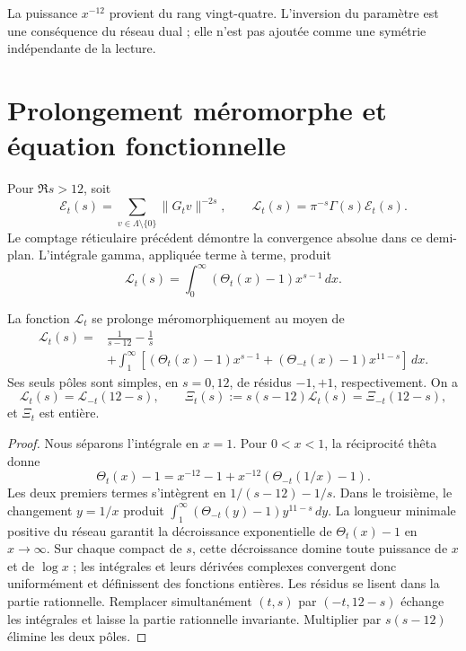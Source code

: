 La puissance \(x^{-12}\) provient du rang vingt-quatre. L’inversion du paramètre est une conséquence du réseau dual ; elle n’est pas ajoutée comme une symétrie indépendante de la lecture.

\section{Prolongement méromorphe et équation fonctionnelle}

Pour \(\Re s>12\), soit
\begin{equation}
 \mathcal E_t(s)=\sum_{v\in\Lambda\setminus\{0\}}\|G_tv\|^{-2s},
 \qquad \mathcal L_t(s)=\pi^{-s}\Gamma(s)\mathcal E_t(s).
 \label{x_reciprocidad:rec:eq:epstein}
\end{equation}
Le comptage réticulaire précédent démontre la convergence absolue dans ce demi-plan. L'intégrale gamma, appliquée terme à terme, produit
\[
 \mathcal L_t(s)=\int_0^\infty(\Theta_t(x)-1)x^{s-1}\,dx.
\]

\begin{theorem}
\label{x_reciprocidad:rec:thm:mellin}
La fonction \(\mathcal L_t\) se prolonge méromorphiquement au moyen de
\begin{align}
 \mathcal L_t(s)={}&\frac1{s-12}-\frac1s\nonumber\\
 &+\int_1^\infty\left[(\Theta_t(x)-1)x^{s-1}
                 +(\Theta_{-t}(x)-1)x^{11-s}\right]\,dx.
 \label{x_reciprocidad:rec:eq:mellin-partida}
\end{align}
Ses seuls pôles sont simples, en \(s=0,12\), de résidus \(-1,+1\), respectivement. On a
\begin{equation}
 \mathcal L_t(s)=\mathcal L_{-t}(12-s),\qquad
 \Xi_t(s):=s(s-12)\mathcal L_t(s)=\Xi_{-t}(12-s),
 \label{x_reciprocidad:rec:eq:funcional}
\end{equation}
et \(\Xi_t\) est entière.
\end{theorem}
\begin{proof}
Nous séparons l’intégrale en \(x=1\). Pour \(0<x<1\), la réciprocité thêta donne
\[
 \Theta_t(x)-1=x^{-12}-1+x^{-12}(\Theta_{-t}(1/x)-1).
\]
Les deux premiers termes s'intègrent en \(1/(s-12)-1/s\). Dans le troisième, le changement \(y=1/x\) produit \(\int_1^\infty(\Theta_{-t}(y)-1)y^{11-s}\,dy\). La longueur minimale positive du réseau garantit la décroissance exponentielle de \(\Theta_t(x)-1\) en \(x\to\infty\). Sur chaque compact de \(s\), cette décroissance domine toute puissance de \(x\) et de \(\log x\) ; les intégrales et leurs dérivées complexes convergent donc uniformément et définissent des fonctions entières. Les résidus se lisent dans la partie rationnelle. Remplacer simultanément \((t,s)\) par \((-t,12-s)\) échange les intégrales et laisse la partie rationnelle invariante. Multiplier par \(s(s-12)\) élimine les deux pôles.
\end{proof}

